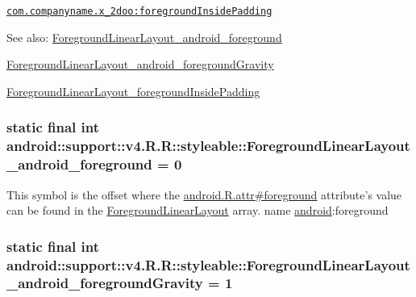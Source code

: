 {\tt \hyperlink{classandroid_1_1support_1_1v4_1_1_r_1_1styleable_24c3790a2ccc17ca22f459138b2b1299}{com.companyname.x\_\-2doo:foregroundInsidePadding}}

\begin{Desc}
\item[See also:]\hyperlink{classandroid_1_1support_1_1v4_1_1_r_1_1styleable_07d1b8161309552e2bdeaabfe9a14379}{ForegroundLinearLayout\_\-android\_\-foreground} 

\hyperlink{classandroid_1_1support_1_1v4_1_1_r_1_1styleable_360249f2f1dfcbff7fbdc1596e41e43d}{ForegroundLinearLayout\_\-android\_\-foregroundGravity} 

\hyperlink{classandroid_1_1support_1_1v4_1_1_r_1_1styleable_24c3790a2ccc17ca22f459138b2b1299}{ForegroundLinearLayout\_\-foregroundInsidePadding} \end{Desc}
\hypertarget{classandroid_1_1support_1_1v4_1_1_r_1_1styleable_07d1b8161309552e2bdeaabfe9a14379}{
\subsubsection[{ForegroundLinearLayout\_\-android\_\-foreground}]{\setlength{\rightskip}{0pt plus 5cm}static final int android::support::v4.R.R::styleable::ForegroundLinearLayout\_\-android\_\-foreground = 0}}
\label{classandroid_1_1support_1_1v4_1_1_r_1_1styleable_07d1b8161309552e2bdeaabfe9a14379}


This symbol is the offset where the \hyperlink{}{android.R.attr\#foreground} attribute's value can be found in the \hyperlink{classandroid_1_1support_1_1v4_1_1_r_1_1styleable_bbe0a7c41b965e1656d09f3bc52b2751}{ForegroundLinearLayout} array.  name \hyperlink{namespaceandroid}{android}:foreground \hypertarget{classandroid_1_1support_1_1v4_1_1_r_1_1styleable_360249f2f1dfcbff7fbdc1596e41e43d}{
\subsubsection[{ForegroundLinearLayout\_\-android\_\-foregroundGravity}]{\setlength{\rightskip}{0pt plus 5cm}static final int android::support::v4.R.R::styleable::ForegroundLinearLayout\_\-android\_\-foregroundGravity = 1}}
\label{classandroid_1_1support_1_1v4_1_1_r_1_1styleable_360249f2f1dfcbff7fbdc1596e41e43d}


